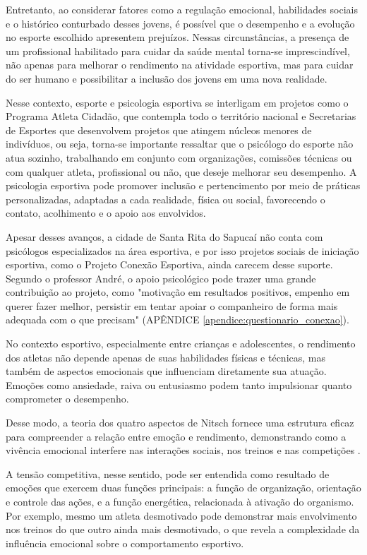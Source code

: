 \begin{Desenvolvimento}
Entretanto, ao considerar fatores como a regulação emocional, habilidades sociais e o histórico conturbado desses jovens, é possível que o desempenho e a evolução no esporte escolhido apresentem prejuízos. Nessas circunstâncias, a presença de um profissional habilitado para cuidar da saúde mental torna-se imprescindível, não apenas para melhorar o rendimento na atividade esportiva, mas para cuidar do ser humano e possibilitar a inclusão dos jovens em uma nova realidade.

Nesse contexto, esporte e psicologia esportiva se interligam em projetos como o Programa Atleta Cidadão, que contempla todo o território nacional e Secretarias de Esportes que desenvolvem projetos que atingem núcleos menores de indivíduos, ou seja, torna-se importante  ressaltar que o psicólogo do esporte não atua sozinho, trabalhando em conjunto com organizações, comissões técnicas ou com qualquer atleta, profissional ou não, que deseje melhorar seu desempenho. A psicologia esportiva pode promover inclusão e pertencimento por meio de práticas personalizadas, adaptadas a cada realidade, física ou social, favorecendo o contato, acolhimento e o apoio aos envolvidos.

Apesar desses avanços, a cidade de Santa Rita do Sapucaí não conta com psicólogos especializados na área esportiva, e por isso projetos sociais de iniciação esportiva, como o Projeto Conexão Esportiva, ainda carecem desse suporte. Segundo o professor André, o apoio psicológico pode trazer uma grande contribuição ao projeto, como "motivação em resultados positivos, empenho em querer fazer melhor, persistir em tentar apoiar o companheiro de forma mais adequada com o que precisam" (APÊNDICE \ref{apendice:questionario_conexao}).

No contexto esportivo, especialmente entre crianças e adolescentes, o rendimento dos atletas não depende apenas de suas habilidades físicas e técnicas, mas também de aspectos emocionais que influenciam diretamente sua atuação. Emoções como ansiedade, raiva ou entusiasmo podem tanto impulsionar quanto comprometer o desempenho.

Desse modo, a teoria dos quatro aspectos de Nitsch fornece uma estrutura eficaz para compreender a relação entre emoção e rendimento, demonstrando como a vivência emocional interfere nas interações sociais, nos treinos e nas competições .

A tensão competitiva, nesse sentido, pode ser entendida como resultado de emoções que exercem duas funções principais: a função de organização, orientação e controle das ações, e a função energética, relacionada à ativação do organismo. Por exemplo, mesmo um atleta desmotivado pode demonstrar mais envolvimento nos treinos do que outro ainda mais desmotivado, o que revela a complexidade da influência emocional sobre o comportamento esportivo.


\end{Desenvolvimento}
